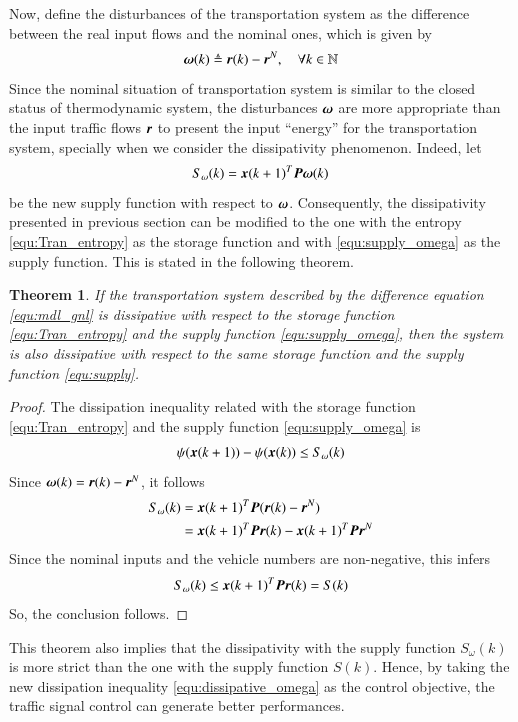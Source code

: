 \documentclass[preprint,authoryear,12pt]{elsarticle}
\renewcommand{\vec}[1]{\mbox{\boldmath$#1$}}
\newcommand{\mat}[1]{\mbox{\boldmath$#1$}}
\newtheorem{thm}{Theorem}
\begin{document}
Now, define the disturbances of the transportation system as the
difference between the real input flows and the nominal ones, which
is given by
\begin{equation}
\vec{\omega}(k)\triangleq\vec{r}(k)-\vec{r}^N, \quad \forall k\in\mathbb{N}
\end{equation}
Since the nominal situation of transportation system is similar to
the closed status of thermodynamic system, the disturbances
$\vec{\omega}$ are more appropriate than the input traffic flows
$\vec{r}$ to present the input ``energy'' for the transportation
system, specially when we consider the dissipativity phenomenon.
Indeed, let
\begin{equation}\label{equ:supply_omega}
  S_\omega(k) = \vec{x}(k+1)^T \mat{P} \vec{\omega}(k)
\end{equation}
be the new supply function with respect to $\vec{\omega}$.
Consequently, the dissipativity presented in previous section can be
modified to the one with the entropy \eqref{equ:Tran_entropy} as the
storage function and with \eqref{equ:supply_omega} as the supply
function. This is stated in the following theorem.

\begin{thm}
If the transportation system described by the difference equation
\eqref{equ:mdl_gnl} is dissipative with respect to the storage
function \eqref{equ:Tran_entropy} and the supply function
\eqref{equ:supply_omega}, then the system is also dissipative with
respect to the same storage function and the supply function
\eqref{equ:supply}.
\end{thm}
\begin{proof}
The dissipation inequality related with the storage function
\eqref{equ:Tran_entropy} and the supply function
\eqref{equ:supply_omega} is
\begin{equation}\label{equ:dissipative_omega}
  \psi(\vec{x}(k+1))-\psi(\vec{x}(k)) \leq S_\omega(k)
\end{equation}
Since $\vec{\omega}(k)=\vec{r}(k)-\vec{r}^N$, it follows
\begin{align*}
S_\omega(k) &= \vec{x}(k+1)^T \mat{P} (\vec{r}(k)-\vec{r}^N)\\
    &= \vec{x}(k+1)^T \mat{P} \vec{r}(k)-\vec{x}(k+1)^T\mat{P}\vec{r}^N
\end{align*}
Since the nominal inputs and the vehicle numbers are non-negative,
this infers
$$S_\omega(k)\leq \vec{x}(k+1)^T \mat{P} \vec{r}(k) = S(k)$$
So, the conclusion follows.
\end{proof}
This theorem also implies that the dissipativity with the supply
function $S_\omega(k)$ is more strict than the one with the supply
function $S(k)$. Hence, by taking the new dissipation inequality
\eqref{equ:dissipative_omega} as the control objective, the traffic
signal control can generate better performances.
\end{document}
